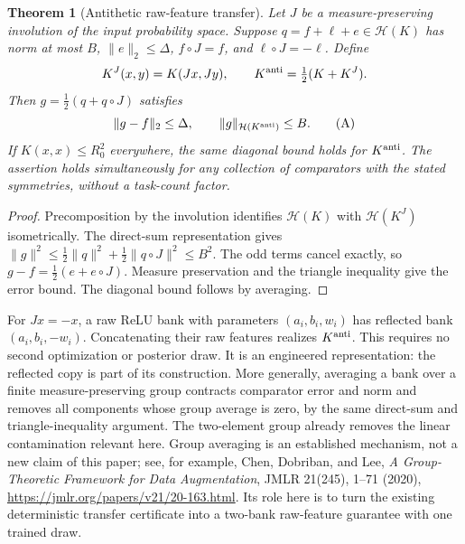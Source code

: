 \documentclass[11pt]{article}
\newtheorem{theorem}{Theorem}\newtheorem{lemma}[theorem]{Lemma}
\begin{document}
\begin{theorem}[Antithetic raw-feature transfer]\label{thm:antithetic}
Let $J$ be a measure-preserving involution of the input probability
space. Suppose $q=f+\ell+e\in\mathcal H(K)$ has norm at most $B$,
$\|e\|_2\le\Delta$, $f\circ J=f$, and $\ell\circ J=-\ell$.
Define
\[
 K^J(x,y)=K(Jx,Jy),\qquad K^{\rm anti}=\tfrac12(K+K^J).
\]
Then $g=\tfrac12(q+q\circ J)$ satisfies
\[
       \|g-f\|_2\le\Delta,\qquad
       \|g\|_{\mathcal H(K^{\rm anti})}\le B.           \tag{A}
\]
If $K(x,x)\le R_0^2$ everywhere, the same diagonal bound holds for
$K^{\rm anti}$. The assertion holds simultaneously for any collection
of comparators with the stated symmetries, without a task-count factor.
\end{theorem}
\begin{proof}
Precomposition by the involution identifies $\mathcal H(K)$ with
$\mathcal H(K^J)$ isometrically. The direct-sum representation gives
$\|g\|^2\le\tfrac12\|q\|^2+\tfrac12\|q\circ J\|^2\le B^2$.
The odd terms cancel exactly, so $g-f=\tfrac12(e+e\circ J)$.
Measure preservation and the triangle inequality give the error bound.
The diagonal bound follows by averaging.
\end{proof}

For $Jx=-x$, a raw ReLU bank with parameters $(a_i,b_i,w_i)$ has
reflected bank $(a_i,b_i,-w_i)$. Concatenating their raw features realizes
$K^{\rm anti}$. This requires no second optimization or posterior draw.
It is an engineered representation: the reflected copy is part of its
construction. More generally, averaging a bank over a finite
measure-preserving group contracts comparator error and norm and removes
all components whose group average is zero, by the same direct-sum and
triangle-inequality argument. The two-element group already removes the
linear contamination relevant here. Group averaging is an established
mechanism, not a new claim of this paper; see, for example, Chen, Dobriban,
and Lee, \emph{A Group-Theoretic Framework for Data Augmentation},
JMLR 21(245), 1--71 (2020),
\url{https://jmlr.org/papers/v21/20-163.html}. Its role here is to turn
the existing deterministic transfer certificate into a two-bank raw-feature
guarantee with one trained draw.
\end{document}

